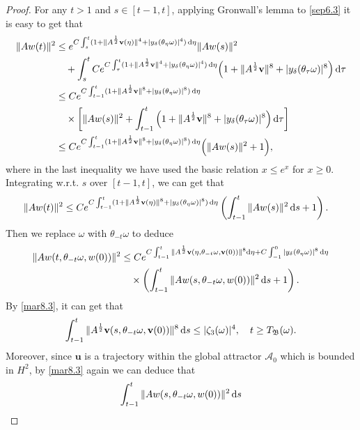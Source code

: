 \documentclass{elsarticle}
\theoremstyle{definition}
\numberwithin{equation}{section}
\renewcommand{\d}{{\rm{d}}}
\begin{document}
\begin{proof}
 For any $t >1$ and $s\in[t-1,t]$, applying Gronwall's lemma to \eqref{sep6.3}   it is easy to get that
\begin{align*}
\|Aw(t)\|^2&\leq e^{C\int_s^t( 1+\|A^\frac12 \textbf{v}(\eta)\|^4 +|y_\delta(\theta_\eta\omega)|^4)\, \d \eta}\|Aw(s)\|^2 \nonumber\\
&\quad +\int_s^t Ce^{C\int_\tau^t  (1+\|A^\frac12 \textbf{v}\|^4+|y_\delta(\theta_\eta\omega)|^4)\, \d \eta}
 \Big (1+\|A^\frac12 \textbf{v}\|^8  +|y_\delta(\theta_\tau\omega)|^8\Big ) \, \d \tau\nonumber\\
&\leq Ce^{C\int_{t-1}^t(1+\|A^\frac12 \textbf{v}\|^8 +|y_\delta(\theta_\eta\omega)|^8)\, \d \eta} \nonumber \\
&\quad \times \left [\|Aw(s)\|^2+\int_{t-1}^t
\left(1+\|A^\frac12 \textbf{v}\|^8  +|y_\delta(\theta_\tau\omega)|^8\right)\d \tau \right]\\
& \leq Ce^{C\int_{t-1}^t(1+\|A^\frac12 \textbf{v}\|^8 +|y_\delta(\theta_\eta\omega)|^8)\, \d \eta} \Big(\|Aw(s)\|^2+ 1 \Big)
, \nonumber
\end{align*}
where in the last inequality we have used the basic relation $x\leq e^x$ for $x\geq 0$.
Integrating w.r.t. $s$ over   $  [t-1,t] $, we can get that
 \begin{align*}
\|Aw(t)\|^2
&\leq Ce^{C\int_{t-1}^t  (1+\|A^\frac12 \textbf{v}(\eta)\|^8+|y_\delta(\theta_\eta\omega)|^8)\, \d \eta}
 \left (\int_{t-1}^t\|Aw(s)\|^2\, \d s + 1\right). \nonumber
\end{align*}
Then we replace $\omega$ with $\theta_{-t}\omega$ to deduce
\begin{align}\label{4.22}
\|Aw(t,\theta_{-t}\omega,w(0))\|^2
&\leq Ce^{C\int_{t-1}^t \|A^\frac12 \textbf{v}(\eta,\theta_{-t}\omega, \textbf{v}(0))\|^8 \d \eta + C\int^0_{-1} |y_\delta(\theta_{\eta}\omega) |^8
\, \d \eta}\nonumber\\
&\quad \times \left(\int_{t-1}^t\|Aw(s,\theta_{-t}\omega,w(0))\|^2\, \d s +1  \right) .
\end{align}
By \eqref{mar8.3}, it can get that
\begin{align} \label{4.23}
  \int_{t-1}^t  \|A^\frac12 \textbf{v}(s,\theta_{-t}\omega,\textbf{v}(0))\|^8\, \d s \leq  |\zeta_3(\omega)|^4   ,  \quad t\geq T_{\mathfrak B}(\omega).
\end{align}
Moreover, since $\textbf{u}$ is a trajectory within the global attractor $\mathcal A_0$ which is   bounded  in $H^2$,  by \eqref{mar8.3}  again we can deduce that
\begin{align}
\int_{t-1}^t\|Aw(s,\theta_{-t}\omega,w(0))\|^2\, \d s

\end{align}
\end{proof}
\end{document}
